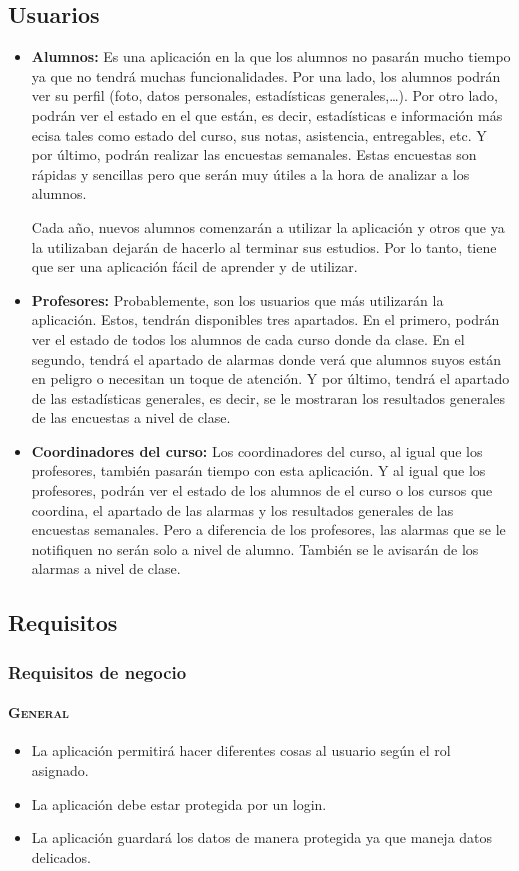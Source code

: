 \subsection{Usuarios}
\begin{itemize}
\item \textbf{Alumnos:}
Es una aplicación en la que los alumnos no pasarán mucho tiempo ya que no tendrá muchas funcionalidades. Por una lado, los alumnos podrán ver su perfil (foto, datos personales, estadísticas generales,…). Por otro lado,  podrán ver el estado en el que están, es decir, estadísticas e información más ecisa tales como estado del curso, sus notas, asistencia, entregables, etc.  Y por último, podrán realizar las encuestas semanales. Estas encuestas son rápidas y sencillas pero que serán muy útiles a la hora de analizar a los alumnos.

Cada año, nuevos alumnos comenzarán a utilizar la aplicación y otros que ya la utilizaban dejarán de hacerlo al terminar sus estudios. Por lo tanto, tiene que ser una aplicación fácil de aprender y de utilizar.
\item \textbf{Profesores:}
Probablemente, son los usuarios que más utilizarán la aplicación. Estos, tendrán disponibles tres apartados. En el primero, podrán ver el estado de todos los alumnos de cada curso donde da clase. En el segundo, tendrá el apartado de alarmas donde verá que alumnos suyos están en peligro o necesitan un toque de atención. Y por último, tendrá el apartado de las estadísticas generales, es decir, se le mostraran los resultados generales de las encuestas a nivel de clase.
\item \textbf{Coordinadores del curso:}
Los coordinadores del curso, al igual que los profesores, también pasarán tiempo con esta aplicación. Y al igual que los profesores, podrán ver el estado de los alumnos de el curso o los cursos que coordina, el apartado de las alarmas y los resultados generales de las encuestas semanales. Pero a diferencia de los profesores, las alarmas que se le notifiquen no serán solo a nivel de alumno. También se le avisarán de los alarmas a nivel de clase.
\end{itemize}
\subsection{Requisitos}
\subsubsection{Requisitos de negocio}
\paragraph{\textsc {General}}
\begin{itemize}
\item {La aplicación permitirá hacer diferentes cosas al usuario según el rol asignado.}
\item {La aplicación debe estar protegida por un login.}
\item {La aplicación guardará los datos de manera protegida ya que maneja datos delicados.}
\end{itemize}
